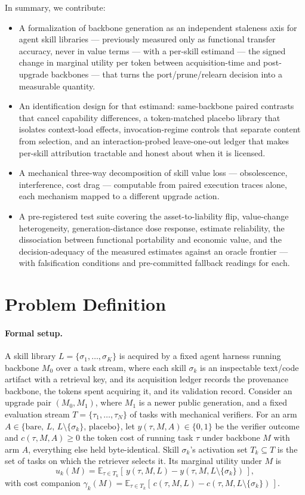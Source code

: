 \documentclass[11pt]{article}
\begin{document}
In summary, we contribute:
\begin{itemize}
  \item A formalization of backbone generation as an independent staleness axis for agent skill libraries --- previously measured only as functional transfer accuracy, never in value terms --- with a per-skill estimand --- the signed change in marginal utility per token between acquisition-time and post-upgrade backbones --- that turns the port/prune/relearn decision into a measurable quantity.
  \item An identification design for that estimand: same-backbone paired contrasts that cancel capability differences, a token-matched placebo library that isolates context-load effects, invocation-regime controls that separate content from selection, and an interaction-probed leave-one-out ledger that makes per-skill attribution tractable and honest about when it is licensed.
  \item A mechanical three-way decomposition of skill value loss --- obsolescence, interference, cost drag --- computable from paired execution traces alone, each mechanism mapped to a different upgrade action.
  \item A pre-registered test suite covering the asset-to-liability flip, value-change heterogeneity, generation-distance dose response, estimate reliability, the dissociation between functional portability and economic value, and the decision-adequacy of the measured estimates against an oracle frontier --- with falsification conditions and pre-committed fallback readings for each.
\end{itemize}

\section{Problem Definition}

\paragraph{Formal setup.}
A skill library $L = \{\sigma_1, \ldots, \sigma_K\}$ is acquired by a fixed agent harness running backbone $M_0$ over a task stream, where each skill $\sigma_k$ is an inspectable text/code artifact with a retrieval key, and its acquisition ledger records the provenance backbone, the tokens spent acquiring it, and its validation record. Consider an upgrade pair $(M_0, M_1)$, where $M_1$ is a newer public generation, and a fixed evaluation stream $T = \{\tau_1, \ldots, \tau_N\}$ of tasks with mechanical verifiers. For an arm $A \in \{\mathrm{bare},\, L,\, L \setminus \{\sigma_k\},\, \mathrm{placebo}\}$, let $y(\tau, M, A) \in \{0, 1\}$ be the verifier outcome and $c(\tau, M, A) \geq 0$ the token cost of running task $\tau$ under backbone $M$ with arm $A$, everything else held byte-identical. Skill $\sigma_k$'s activation set $T_k \subseteq T$ is the set of tasks on which the retriever selects it. Its marginal utility under $M$ is
\[
u_k(M) = \mathbb{E}_{\tau \in T_k}\!\left[\, y(\tau, M, L) - y(\tau, M, L \setminus \{\sigma_k\}) \,\right],
\]
with cost companion $\gamma_k(M) = \mathbb{E}_{\tau \in T_k}[\, c(\tau, M, L) - c(\tau, M, L \setminus \{\sigma_k\}) \,]$.
\end{document}

